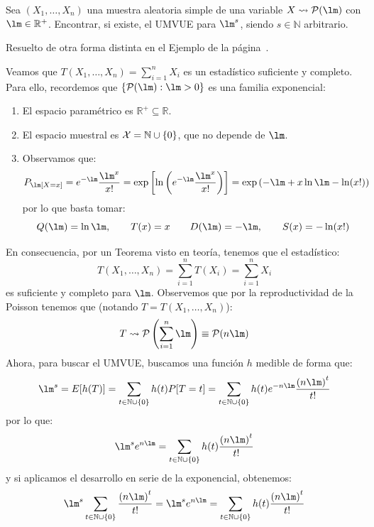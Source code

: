\begin{ejercicio}
    Sea $(X_1, \ldots, X_n)$ una muestra aleatoria simple de una variable $X\rightsquigarrow \cc{P}(\lm)$ con $\lm\in \mathbb{R}^+$. Encontrar, si existe, el UMVUE para $\lm^s$, siendo $s\in \mathbb{N}$ arbitrario.

    \begin{observacion}
        Resuelto de otra forma distinta en el Ejemplo de la página~\pageref{ej:UMVUE-Poisson}.
    \end{observacion}
    
    Veamos que $T(X_1, \ldots, X_n) = \sum\limits_{i=1}^{n}X_i$ es un estadístico suficiente y completo. Para ello, recordemos que $\{\cc{P}(\lm) : \lm>0\}$ es una familia exponencial:
    \begin{enumerate}
        \item El espacio paramétrico es $\mathbb{R}^+ \subseteq \mathbb{R}$.
        \item El espacio muestral es $\mathcal{X}=\mathbb{N}\cup \{0\}$, que no depende de $\lm$.
        \item Observamos que:
            \begin{align*}
                P_\lm[X=x] &= e^{-\lm}\dfrac{\lm^x}{x!} = \exp\left[\ln\left(e^{-\lm}\dfrac{\lm^x}{x!}\right)\right] = \exp\left(-\lm + x\ln\lm -\ln(x!)\right)
            \end{align*}
            por lo que basta tomar:
            \begin{equation*}
                Q(\lm) = \ln\lm, \qquad T(x) = x \qquad D(\lm) = -\lm, \qquad S(x) = -\ln(x!)
            \end{equation*}
    \end{enumerate}
    En consecuencia, por un Teorema visto en teoría, tenemos que el estadístico:
    \begin{equation*}
        T(X_1, \ldots, X_n) = \sum_{i=1}^{n}T(X_i) = \sum_{i=1}^{n}X_i
    \end{equation*}
    es suficiente y completo para $\lm$. Observemos que por la reproductividad de la Poisson tenemos que (notando $T=T(X_1, \ldots, X_n)$): 
    \begin{equation*}
        T\rightsquigarrow \cc{P}\left(\sum_{i=1}^{n}\lm\right) \equiv \cc{P}(n\lm)
    \end{equation*}
    Ahora, para buscar el UMVUE, buscamos una función $h$ medible de forma que:
    \begin{equation*}
        \lm^s = E[h(T)] = \sum_{t\in \mathbb{N}\cup \{0\}}h(t)P[T=t] = \sum_{t\in \mathbb{N}\cup \{0\}} h(t) e^{-n\lm} \dfrac{{(n\lm)}^{t}}{t!} 
    \end{equation*}
    por lo que:
    \begin{equation*}
        \lm^s e^{n\lm} = \sum_{t\in \mathbb{N}\cup \{0\}} h(t)\dfrac{{(n\lm)}^{t}}{t!}
    \end{equation*}
    y si aplicamos el desarrollo en serie de la exponencial, obtenemos:
    \begin{equation*}
        \lm^s \sum_{t\in \mathbb{N}\cup \{0\}} \dfrac{{(n\lm)}^{t}}{t!} = \lm^s e^{n\lm} = \sum_{t\in \mathbb{N}\cup\{0\}} h(t) \dfrac{{(n\lm)}^{t}}{t!} 
    \end{equation*}


\end{ejercicio}
